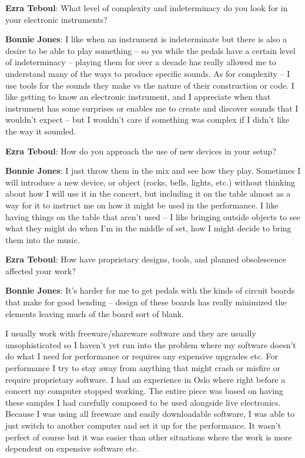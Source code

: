 \textbf{Ezra Teboul}: What level of complexity and indeterminacy do you look for in your electronic instruments? 

\textbf{Bonnie Jones}: I like when an instrument is indeterminate but there is also a desire to be able to play something – so yes while the pedals have a certain level of indeterminacy – playing them for over a decade has really allowed me to understand many of the ways to produce specific sounds. As for complexity – I use tools for the sounds they make vs the nature of their construction or code. I like getting to know an electronic instrument, and I appreciate when that instrument has some surprises or enables me to create and discover sounds that I wouldn’t expect – but I wouldn’t care if something was complex if I didn’t like the way it sounded. 


\textbf{Ezra Teboul}: How do you approach the use of new devices in your setup? 

\textbf{Bonnie Jones}: I just throw them in the mix and see how they play. Sometimes I will introduce a new device, or object (rocks, bells, lights, etc.) without thinking about how I will use it in the concert, but including it on the table almost as a way for it to instruct me on how it might be used in the performance. I like having things on the table that aren’t used – I like bringing outside objects to see what they might do when I’m in the middle of set, how I might decide to bring them into the music.

\textbf{Ezra Teboul}: How have proprietary designs, tools, and planned obsolescence affected your work? 

\textbf{Bonnie Jones}: It’s harder for me to get pedals with the kinds of circuit boards that make for good bending – design of these boards has really minimized the elements leaving much of the board sort of blank. 

I usually work with freeware/shareware software and they are usually unsophisticated so I haven’t yet run into the problem where my software doesn’t do what I need for performance or requires any expensive upgrades etc. For performance I try to stay away from anything that might crash or misfire or require proprietary software. I had an experience in Oslo where right before a concert my computer stopped working. The entire piece was based on having these samples I had carefully composed to be used alongside live electronics. Because I was using all freeware and easily downloadable software, I was able to just switch to another computer and set it up for the performance. It wasn’t perfect of course but it was easier than other situations where the work is more dependent on expensive software etc. 

